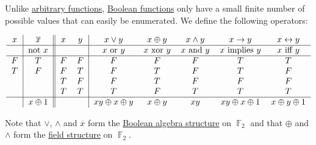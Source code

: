 \begin{definition}\label{def:standard_boolean_operators}
  Unlike \hyperref[def:function/single_valued]{arbitrary functions}, \hyperref[def:boolean_function]{Boolean functions} only have a small finite number of possible values that can easily be enumerated. We define the following operators:

  \begin{equation*}
    \begin{tabular}{c | c || c c | c c c c c c}
      \( x \) & \( \overline{x} \)     & \( x \) & \( y \) & \( x \vee y \)             & \( x \oplus y \)    & \( x \wedge y \)    & \( x \to y \)      & \( x \leftrightarrow y \) \\
      \hline
              & not \( x \)      &         &         & \( x \) or \( y \)         & \( x \) xor \( y \) & \( x \) and \( y \) & \( x \) implies \( y \)    & \( x \) iff \( y \)       \\
      \hline
      \( F \) & \( T \)          & \( F \) & \( F \) & \( F \)                    & \( F \)             & \( F \)             & \( T \)                    & \( T \)                   \\
      \( T \) & \( F \)          & \( F \) & \( T \) & \( F \)                    & \( T \)             & \( F \)             & \( T \)                    & \( F \)                   \\
              &                  & \( T \) & \( F \) & \( F \)                    & \( T \)             & \( F \)             & \( F \)                    & \( F \)                   \\
              &                  & \( T \) & \( T \) & \( T \)                    & \( F \)             & \( T \)             & \( T \)                    & \( T \)                   \\
      \hline
              & \( x \oplus 1 \) &         &         & \( xy \oplus x \oplus y \) & \( x \oplus y \)    & \( xy \)            & \( xy \oplus x \oplus 1 \) & \( x \oplus y \oplus 1 \)
    \end{tabular}
  \end{equation*}

  Note that \( \vee \), \( \wedge \) and \( \overline{x} \) form the \hyperref[thm:f2_is_boolean_algebra]{Boolean algebra structure} on \( \BbbF_2 \) and that \( \oplus \) and \( \wedge \) form the \hyperref[def:field]{field structure} on \( \BbbF_2 \).
\end{definition}

